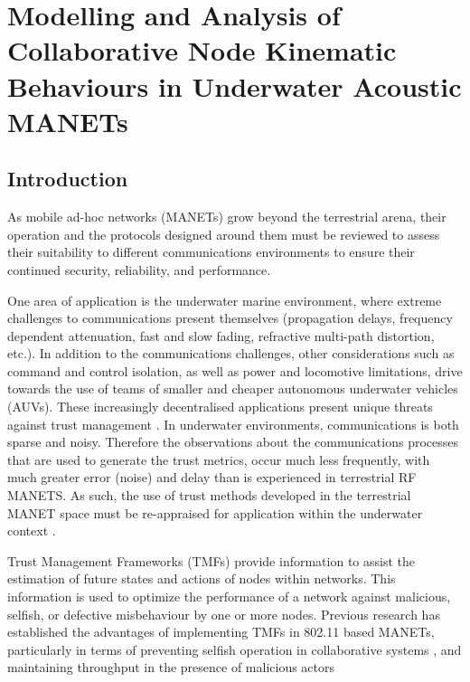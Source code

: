 \def\ChapterTitle{Modelling and Analysis of Collaborative Node Kinematic Behaviours in Underwater Acoustic MANETs}

\ifx\ifthesis\undefined

\else
\chapter{\ChapterTitle}
\label{Chapter\thechapter}
\fi




\section{Introduction}\label{sec:introduction}

As mobile ad-hoc networks (MANETs) grow beyond the terrestrial arena, their operation and the protocols designed around them must be reviewed to assess their suitability to different communications environments to ensure their continued security, reliability, and performance.

One area of application is the underwater marine environment, where extreme challenges to communications present themselves (propagation delays, frequency dependent attenuation, fast and slow fading, refractive multi-path distortion, etc.).
In addition to the communications challenges, other considerations such as command and control isolation, as well as power and locomotive limitations, drive towards the use of teams of smaller and cheaper autonomous underwater vehicles (AUVs). 
These increasingly decentralised applications present unique threats against trust management \cite{Caiti2011}.
In underwater environments, communications is both sparse and noisy.
Therefore the observations about the communications processes that are used to generate the trust metrics, occur much less frequently, with much greater error (noise) and delay than is experienced in terrestrial RF MANETS.
As such, the use of trust methods developed in the terrestrial MANET space must be re-appraised for application within the underwater context \cite{Pavan2015}.

Trust Management Frameworks (TMFs) provide information to assist the estimation of future states and actions of nodes within networks.
This information is used to optimize the performance of a network against malicious, selfish, or defective misbehaviour by one or more nodes.
Previous research has established the advantages of implementing TMFs in 802.11 based MANETs, particularly in terms of preventing selfish operation in collaborative systems \cite{Li2007}, and maintaining throughput in the presence of malicious actors \cite{Buchegger2002}

